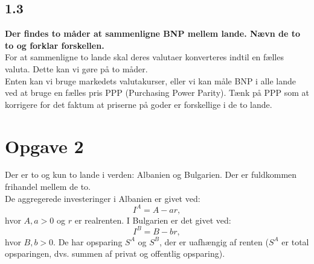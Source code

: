 \documentclass[a4paper, 12pt]{article}
\begin{document}
\subsection*{1.3}
\textbf{Der findes to måder at sammenligne BNP mellem lande. Nævn de to to og forklar forskellen.}
\\
For at sammenligne to lande skal deres valutaer konverteres indtil en fælles valuta. Dette kan vi gøre på to måder.\\
Enten kan vi bruge markedets valutakurser, eller vi kan måle BNP i alle lande ved at bruge en fælles pris PPP (Purchasing Power Parity). Tænk på PPP som at korrigere for det faktum at priserne på goder er forskellige i de to lande.

\section*{Opgave 2}
Der er to og kun to lande i verden: Albanien og Bulgarien. Der er fuldkommen frihandel mellem de to.\\
De aggregerede investeringer i Albanien er givet ved:
$$I^{A} = A - ar,$$
hvor $A,a > 0 $ og $r$ er realrenten. I Bulgarien er det givet ved:
$$I^{B} = B - br,$$
hvor $B,b > 0$. De har opsparing $S^{A} $ og $S^{B}$, der er uafhængig af renten ($S^{A}$ er total opsparingen, dvs. summen af privat og offentlig opsparing).

\end{document}
